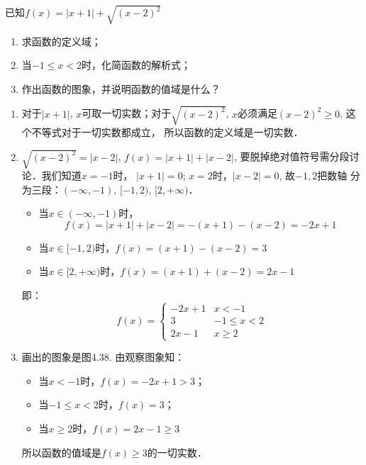 \begin{example}
    已知$f(x)=|x+1|+\sqrt{(x-2)^2}$
\begin{enumerate}
    \item 求函数的定义域；
    \item 当$-1\le x<2$时，化简函数的解析式；
    \item 作出函数的图象，并说明函数的值域是什么？
\end{enumerate}
\end{example}    

\begin{solution}
\begin{enumerate}
    \item 对于$|x+1|$, $x$可取一切实数；对于$\sqrt{(x-2)^2}$,
    $x$必须满足$(x-2)^2\ge 0$, 这个不等式对于一切实数都成立，
    所以函数的定义域是一切实数．
\item $\sqrt{(x-2)^2}=|x-2|$, $f(x)=|x+1|+|x-2|$,
    要脱掉绝对值符号需分段讨论．我们知道$x=-1$时，
    $|x+1|=0$; $x=2$时，$|x-2|=0$, 故$-1,2$把数轴
    分为三段：$(-\infty,-1)$, $[-1,2)$, $[2,+\infty)$．
\begin{itemize}
    \item 当$x\in (-\infty,-1)$时，
    $$f(x)=|x+1|+|x-2|=-(x+1)-(x-2)=-2x+1$$
    \item 当$x\in[-1,2)$时，$f(x)=(x+1)-(x-2)=3$
  \item   当$x\in [2,+\infty)$时，$f(x)=(x+1)+(x-2)=2x-1$
\end{itemize}
即：\[f(x)=\begin{cases}
   -2x+1  & x<-1\\
   3& -1\le x<2\\
   2x-1 & x\ge 2 
\end{cases}\]
\item 画出的图象是图4.38.
由观察图象知：
\begin{itemize}
    \item 当$x<-1$时，$f(x)=-2x+1>3$；
    \item 当$-1\le x<2$时，$f(x)=3$；
    \item 当$x\ge 2$时，$f(x)=2x-1\ge 3$
\end{itemize}
所以函数的值域是$f(x)\ge 3$的一切实数．
\end{enumerate}

\begin{figure}[htp]
    \centering
{}
    \caption{}
\end{figure}


\end{solution}

